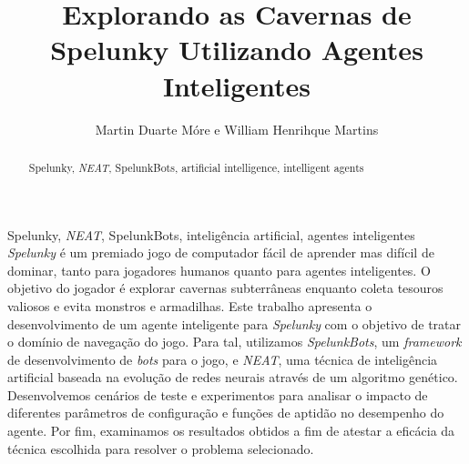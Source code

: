 \documentclass[portuguese,oneside]{tcc}
\author{Martin Duarte Móre e William Henrihque Martins}
\title{Explorando as Cavernas de Spelunky Utilizando Agentes Inteligentes}
      {Exploring Spelunky's Caves Using Intelligent Agents}
\begin{document}



\begin{resumo}{Spelunky, \textit{NEAT}, SpelunkBots, inteligência
artificial, agentes inteligentes}
	\textit{Spelunky} é um premiado jogo de computador fácil de aprender mas
	difícil de dominar, tanto para jogadores humanos quanto para agentes
	inteligentes. O objetivo do jogador é explorar cavernas subterrâneas
	enquanto coleta tesouros valiosos e evita monstros e armadilhas. Este
	trabalho apresenta o desenvolvimento de um agente inteligente para
	\textit{Spelunky} com o objetivo de tratar o domínio de navegação do jogo.
	Para tal, utilizamos \textit{SpelunkBots}, um \textit{framework} de
	desenvolvimento de \textit{bots} para o jogo, e \textit{NEAT}, uma técnica
	de inteligência artificial baseada na evolução de redes neurais através de
	um algoritmo genético.  Desenvolvemos cenários de teste e experimentos para
	analisar o impacto de diferentes parâmetros de configuração e funções de
	aptidão no desempenho do agente. Por fim, examinamos os resultados obtidos a
	fim de atestar a eficácia da técnica escolhida para resolver o problema
	selecionado.
\end{resumo}

\begin{abstract}{Spelunky, \textit{NEAT}, SpelunkBots, artificial intelligence,
intelligent agents}
\end{abstract}

\listoftodos
\listoffigures
\listofalgorithms
\listofacronyms
\tableofcontents













\appendix





\end{document}
